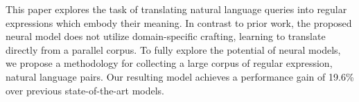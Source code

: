 This paper explores the task of translating natural language queries into regular expressions which embody their meaning. In contrast to prior work, the proposed neural model does not utilize domain-specific crafting, learning to translate directly from a parallel corpus. To fully explore the potential of neural models, we propose a methodology for collecting a large corpus of regular expression, natural language pairs. Our resulting model achieves a performance gain of 19.6\% over previous state-of-the-art models.

